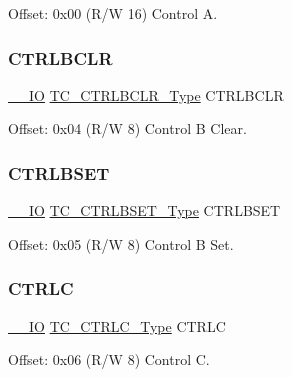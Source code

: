 Offset\+: 0x00 (R/W 16) Control A. 

\mbox{\label{struct_tc_count16_a5d266ecd4b84c85e2136fcdfcdd1e57f}} 
\subsubsection{\texorpdfstring{CTRLBCLR}{CTRLBCLR}}
{\footnotesize\ttfamily \mbox{\hyperlink{core__cm0plus_8h_aec43007d9998a0a0e01faede4133d6be}{\+\_\+\+\_\+\+IO}} \mbox{\hyperlink{union_t_c___c_t_r_l_b_c_l_r___type}{T\+C\+\_\+\+C\+T\+R\+L\+B\+C\+L\+R\+\_\+\+Type}} C\+T\+R\+L\+B\+C\+LR}



Offset\+: 0x04 (R/W 8) Control B Clear. 

\mbox{\label{struct_tc_count16_aad77cd2b986ac4f6e8112f1d8ef850a5}} 
\subsubsection{\texorpdfstring{CTRLBSET}{CTRLBSET}}
{\footnotesize\ttfamily \mbox{\hyperlink{core__cm0plus_8h_aec43007d9998a0a0e01faede4133d6be}{\+\_\+\+\_\+\+IO}} \mbox{\hyperlink{union_t_c___c_t_r_l_b_s_e_t___type}{T\+C\+\_\+\+C\+T\+R\+L\+B\+S\+E\+T\+\_\+\+Type}} C\+T\+R\+L\+B\+S\+ET}



Offset\+: 0x05 (R/W 8) Control B Set. 

\mbox{\label{struct_tc_count16_ac5a6e57255482215b0d11685290ea67a}} 
\subsubsection{\texorpdfstring{CTRLC}{CTRLC}}
{\footnotesize\ttfamily \mbox{\hyperlink{core__cm0plus_8h_aec43007d9998a0a0e01faede4133d6be}{\+\_\+\+\_\+\+IO}} \mbox{\hyperlink{union_t_c___c_t_r_l_c___type}{T\+C\+\_\+\+C\+T\+R\+L\+C\+\_\+\+Type}} C\+T\+R\+LC}



Offset\+: 0x06 (R/W 8) Control C. 

\mbox{\label{struct_tc_count16_ad7d3dc3cf041a0c2b409cdc6a0511ef8}} 
